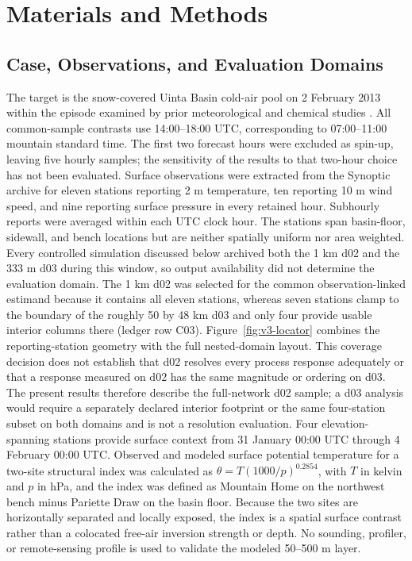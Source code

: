 \documentclass[air,article,submit,moreauthors]{Definitions/mdpi}
\begin{document}
\section{Materials and Methods}

\subsection{Case, Observations, and Evaluation Domains}

The target is the snow-covered Uinta Basin cold-air pool on 2 February 2013 within the episode examined by prior meteorological and chemical studies \citep{Neemann2015-ws,Ahmadov2015-zm}.
All common-sample contrasts use 14:00--18:00 UTC, corresponding to 07:00--11:00 mountain standard time.
The first two forecast hours were excluded as spin-up, leaving five hourly samples; the sensitivity of the results to that two-hour choice has not been evaluated.
Surface observations were extracted from the Synoptic archive for eleven stations reporting 2 m temperature, ten reporting 10 m wind speed, and nine reporting surface pressure in every retained hour.
Subhourly reports were averaged within each UTC clock hour.
The stations span basin-floor, sidewall, and bench locations but are neither spatially uniform nor area weighted.
Every controlled simulation discussed below archived both the 1 km d02 and the 333 m d03 during this window, so output availability did not determine the evaluation domain.
The 1 km d02 was selected for the common observation-linked estimand because it contains all eleven stations, whereas seven stations clamp to the boundary of the roughly 50 by 48 km d03 and only four provide usable interior columns there (ledger row C03).
Figure~\ref{fig:v3-locator} combines the reporting-station geometry with the full nested-domain layout.
This coverage decision does not establish that d02 resolves every process response adequately or that a response measured on d02 has the same magnitude or ordering on d03.
The present results therefore describe the full-network d02 sample; a d03 analysis would require a separately declared interior footprint or the same four-station subset on both domains and is not a resolution evaluation.
Four elevation-spanning stations provide surface context from 31 January 00:00 UTC through 4 February 00:00 UTC.
Observed and modeled surface potential temperature for a two-site structural index was calculated as $\theta=T(1000/p)^{0.2854}$, with $T$ in kelvin and $p$ in hPa, and the index was defined as Mountain Home on the northwest bench minus Pariette Draw on the basin floor.
Because the two sites are horizontally separated and locally exposed, the index is a spatial surface contrast rather than a colocated free-air inversion strength or depth.
No sounding, profiler, or remote-sensing profile is used to validate the modeled 50--500 m layer.
\end{document}
